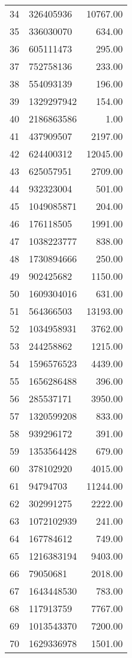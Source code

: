\begin{table}[ht]
\begin{tabular}{rlr}
  34 & 326405936 & 10767.00 \\ 
  35 & 336030070 & 634.00 \\ 
  36 & 605111473 & 295.00 \\ 
  37 & 752758136 & 233.00 \\ 
  38 & 554093139 & 196.00 \\ 
  39 & 1329297942 & 154.00 \\ 
  40 & 2186863586 & 1.00 \\ 
  41 & 437909507 & 2197.00 \\ 
  42 & 624400312 & 12045.00 \\ 
  43 & 625057951 & 2709.00 \\ 
  44 & 932323004 & 501.00 \\ 
  45 & 1049085871 & 204.00 \\ 
  46 & 176118505 & 1991.00 \\ 
  47 & 1038223777 & 838.00 \\ 
  48 & 1730894666 & 250.00 \\ 
  49 & 902425682 & 1150.00 \\ 
  50 & 1609304016 & 631.00 \\ 
  51 & 564366503 & 13193.00 \\ 
  52 & 1034958931 & 3762.00 \\ 
  53 & 244258862 & 1215.00 \\ 
  54 & 1596576523 & 4439.00 \\ 
  55 & 1656286488 & 396.00 \\ 
  56 & 285537171 & 3950.00 \\ 
  57 & 1320599208 & 833.00 \\ 
  58 & 939296172 & 391.00 \\ 
  59 & 1353564428 & 679.00 \\ 
  60 & 378102920 & 4015.00 \\ 
  61 & 94794703 & 11244.00 \\ 
  62 & 302991275 & 2222.00 \\ 
  63 & 1072102939 & 241.00 \\ 
  64 & 167784612 & 749.00 \\ 
  65 & 1216383194 & 9403.00 \\ 
  66 & 79050681 & 2018.00 \\ 
  67 & 1643448530 & 783.00 \\ 
  68 & 117913759 & 7767.00 \\ 
  69 & 1013543370 & 7200.00 \\ 
  70 & 1629336978 & 1501.00 \\ 

\end{tabular}
\end{table}
